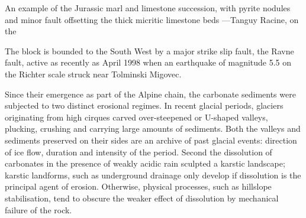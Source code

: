  
\begin{marginfigure}
\checkoddpage \ifoddpage \forcerectofloat \else \forceversofloat \fi
\centering
 \caption{An example of the Jurassic marl and limestone succession, with pyrite nodules and minor fault offsetting the thick micritic limestone beds ---Tanguy Racine, on the \protect{}}
 \label{marls and limestones}
\end{marginfigure}

 The block is bounded to the South West by a major strike slip fault, the Ravne fault, active as recently as April 1998 when an earthquake of magnitude 5.5 on the Richter scale struck near Tolminski Migovec.

Since their emergence as part of the Alpine chain, the carbonate sediments were subjected to two distinct erosional regimes. In recent glacial periods, glaciers originating from high cirques carved over-steepened or U-shaped valleys, plucking, crushing and carrying large amounts of sediments. Both the valleys and sediments preserved on their sides are an archive of past glacial events: direction of ice flow, duration and intensity of the period. Second the dissolution of carbonates in the presence of weakly acidic rain sculpted a karstic landscape; karstic landforms, such as underground drainage only develop if dissolution is the principal agent of erosion. Otherwise, physical processes, such as hillslope stabilisation, tend to obscure the weaker effect of dissolution by mechanical failure of the rock.









